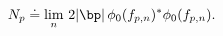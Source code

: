 \begin{equation} \label{density}
N_p \doteq \lim_n \, 2 |\bp| \, \phi_0 (f_{p,n})^* \phi_0 (f_{p,n}).
\end{equation} 
